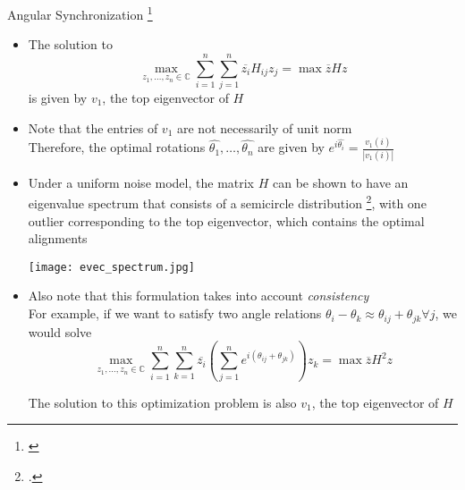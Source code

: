 \begin{frame}{Angular Synchronization \let\thefootnote\relax\footnote{\cite{singer2011angular}}}

    {\scriptsize
    \begin{itemize}
        \item The solution to
        $$\max_{z_1, \dots, z_n \in \mathbb{C}} \sum_{i=1}^{n}\sum_{j=1}^{n} \overline{z_i} H_{ij} z_j = \max \overline{z} H z$$
        is given by $v_1$, the top eigenvector of $H$

        \item Note that the entries of $v_1$ are not necessarily of unit norm\\
        Therefore, the optimal rotations $\hat{\theta_1}, \dots, \hat{\theta_n}$ are given by
        $e^{i \hat{\theta_i}} = \frac{v_1(i)}{|v_1(i)|}$

        \item
        Under a uniform noise model, the matrix $H$ can be shown to have an eigenvalue spectrum that consists of a semicircle distribution \footcite{wigner1955characteristic, wigner1958distribution}, with one outlier corresponding to the top eigenvector, which contains the optimal alignments\\
        \begin{center}
        \texttt{[image: evec\_spectrum.jpg]}
        \end{center}

        \item Also note that this formulation takes into account {\em consistency}\\
        For example, if we want to satisfy two angle relations $\theta_i-\theta_k \approx \theta_{ij} + \theta_{jk} \forall j$, we would solve
        $$\max_{z_1, \dots, z_n \in \mathbb{C}} \sum_{i=1}^{n}\sum_{k=1}^{n} \overline{z_i} \left( \sum_{j=1}^{n} e^{i (\theta_{ij} + \theta_{jk})} \right) z_k = \max \overline{z} H^2 z$$

        The solution to this optimization problem is also $v_1$, the top eigenvector of $H$
    \end{itemize}
    \par}

\end{frame}

